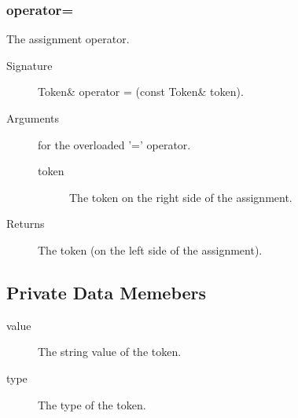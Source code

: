 \subsubsection{operator=}
The assignment operator.
\begin{description}
  \item [Signature] Token\& operator = (const Token\& token).
  \item [Arguments] for the overloaded '=' operator.
    \begin{description}
      \item [token] The token on the right side of the assignment. 
    \end{description}
  \item [Returns] The token (on the left side of the assignment).
\end{description}

\subsection{Private Data Memebers}
\begin{description}
  \item [value] The string value of the token.
  \item [type]  The type of the token.
\end{description}


